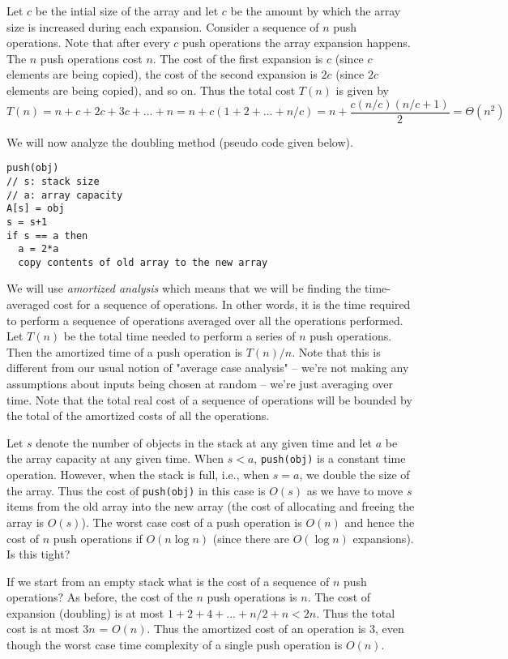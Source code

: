 \documentclass[11pt,twoside]{article}
\begin{document}
Let $c$ be the intial
size of the array and let $c$ be the amount by which the array size is
increased during each expansion. Consider a sequence of $n$ push
operations. Note that after every $c$ push operations the array
expansion happens. The $n$ push operations cost $n$. The cost of the
first expansion is $c$ (since $c$ elements are being copied), the cost
of the second expansion is $2c$ (since $2c$ elements are being
copied), and so on. Thus the total cost $T(n)$ is given by
\[
T(n) = n + c + 2c+ 3c + \ldots + n = n + c(1+2+\ldots + n/c) =
n+\frac{c(n/c)(n/c+1)}{2} = \Theta(n^2)
\]

We will now analyze the doubling method (pseudo code given below). 

\begin{verbatim}
push(obj)
// s: stack size
// a: array capacity
A[s] = obj
s = s+1
if s == a then
  a = 2*a
  copy contents of old array to the new array
\end{verbatim}


We will use \textit{amortized analysis}
which means that we will be finding the time-averaged cost for a
sequence of operations. In other words, it is the time required to
perform a sequence of operations averaged over all the operations
performed. Let $T(n)$ be the total time needed to perform a series of $n$ push
operations. Then the amortized time of a push operation is $T(n)/n$.
Note that this is different from our usual notion of "average
case analysis" -- we're not making any assumptions about
inputs being chosen at random -- we're just averaging over
time. Note that the total
real cost of a sequence of operations will be bounded by the total
of the amortized costs of all the operations. 

Let $s$ denote the number of objects in the stack at any given time
and let $a$ be the array capacity at any given time. When $s < a$,
\texttt{push(obj)} 
is a constant time operation. However, when the stack is full, i.e.,
when $s=a$, we double 
the size of the array. Thus
the cost of \texttt{push(obj)} in this case is $O(s)$ as we have to
move $s$ items from the old array into the new array (the cost of
allocating and freeing the array is $O(s)$). The worst case cost of a
push operation is $O(n)$ and hence the cost of $n$ push operations if
$O(n\log n)$ (since there are $O(\log n)$ expansions). Is this tight?

If we start from an empty stack what is the cost of a sequence of $n$
push operations? As before, the cost of the $n$ push operations is
$n$. The cost of expansion (doubling) is at most $1+2+4+\ldots + n/2 +n <
2n$. Thus the total cost is at most $3n$ = $O(n)$. Thus the amortized cost of an
operation is 3, even though the worst case time complexity of a single
push operation is $O(n)$. 
\end{document}
